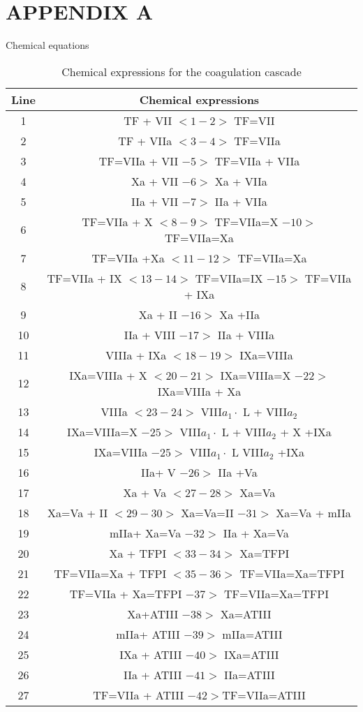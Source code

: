 \begin{table}
\section*{APPENDIX A}
Chemical equations
\begin{center}
 \caption{Chemical expressions for the coagulation cascade}\label{taba}
 \vspace{3mm}
\begin{tabular}{|c|c|}\hline
Line&Chemical expressions\\\hline
  1& TF + VII $<1-2>$ TF=VII\\\hline
  2& TF + VIIa $<3-4>$ TF=VIIa\\\hline
 3 & TF=VIIa + VII $ -5>$ TF=VIIa + VIIa  \\\hline
 4 & Xa + VII $-6>$ Xa +
VIIa \\\hline
  5 & IIa + VII $-7>$ IIa + VIIa \\\hline
  6 &TF=VIIa + X  $<8-9>$ TF=VIIa=X $-10>$ TF=VIIa=Xa\\\hline
7 & TF=VIIa +Xa $<11-12>$ TF=VIIa=Xa\\\hline
 8 &TF=VIIa + IX $<13-14>$ TF=VIIa=IX $-15>$ TF=VIIa + IXa\\\hline
  9& Xa + II $-16>$ Xa +IIa \\\hline
  10& IIa + VIII $-17>$ IIa + VIIIa \\\hline
  11& VIIIa + IXa $<18-19>$ IXa=VIIIa \\\hline
  12 & IXa=VIIIa +  X $<20-21>$ IXa=VIIIa=X $-22>$ IXa=VIIIa +
  Xa\\\hline
13 & VIIIa $<23-24>$ VIII$a_1\cdot$ L +  VIII$a_2$\\\hline 14&
IXa=VIIIa=X $-25>$ VIII$a_1\cdot$ L + VIII$a_2$ + X +IXa\\\hline
 15& IXa=VIIIa $-25>$ VIII$a_1\cdot$ L VIII$a_2$ +IXa\\\hline
  16& IIa+ V $-26>$ IIa +Va\\\hline
   17 &Xa + Va $<27-28>$ Xa=Va \\\hline
   18& Xa=Va + II $<29-30>$ Xa=Va=II $-31>$ Xa=Va + mIIa\\\hline
    19& mIIa+ Xa=Va $-32>$ IIa + Xa=Va \\\hline
    20& Xa + TFPI $<33-34>$ Xa=TFPI \\\hline
    21& TF=VIIa=Xa + TFPI $<35-36>$ TF=VIIa=Xa=TFPI \\\hline
    22 & TF=VIIa + Xa=TFPI $-37>$ TF=VIIa=Xa=TFPI \\\hline
    23& Xa+ATIII $-38>$ Xa=ATIII\\\hline
     24& mIIa+ ATIII $-39>$ mIIa=ATIII\\\hline
      25& IXa + ATIII $-40>$ IXa=ATIII\\\hline
26& IIa + ATIII $-41>$ IIa=ATIII\\\hline
 27& TF=VIIa + ATIII $-42>$TF=VIIa=ATIII\\\hline
\end{tabular}


\end{center}
\end{table}

